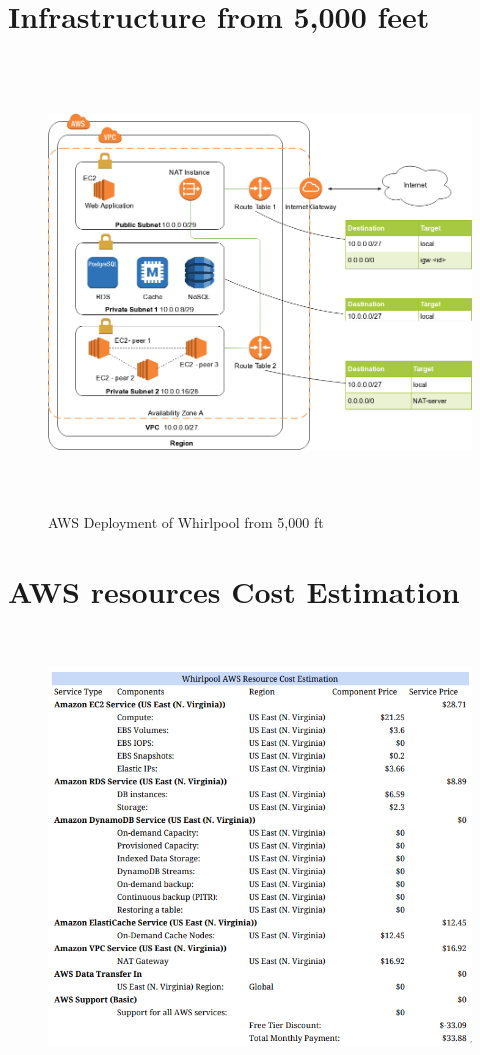 
\section{Infrastructure from 5,000 feet}
\begin{figure}[h!]
  \centering
  \includegraphics[width=20cm,height=12cm,keepaspectratio]{../media/crawler/aws-deploy-5k-feet.png}
  \caption{AWS Deployment of Whirlpool from 5,000 ft}
\end{figure}

\pagebreak

\section{AWS resources Cost Estimation}
\begin{figure}[h!]
  \centering
  \includegraphics[width=20cm,height=12cm,keepaspectratio]{../media/crawler/aws-cost-estimate.png}
\end{figure}

\pagebreak